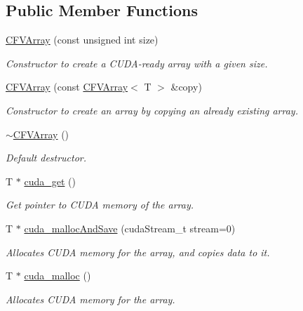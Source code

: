 \subsection*{Public Member Functions}
\begin{DoxyCompactItemize}
\item 
\hyperlink{classFVL_1_1CFVArray_a4533252544513e80b44814b8afab3190}{CFVArray} (const unsigned int size)
\begin{DoxyCompactList}\small\item\em Constructor to create a CUDA-\/ready array with a given size. \item\end{DoxyCompactList}\item 
\hyperlink{classFVL_1_1CFVArray_a2bfe813d44db8292ff5793db73fe7fe0}{CFVArray} (const \hyperlink{classFVL_1_1CFVArray}{CFVArray}$<$ T $>$ \&copy)
\begin{DoxyCompactList}\small\item\em Constructor to create an array by copying an already existing array. \item\end{DoxyCompactList}\item 
\hyperlink{classFVL_1_1CFVArray_a3c7cfa5d9c6793cd2866030b734b5987}{$\sim$CFVArray} ()
\begin{DoxyCompactList}\small\item\em Default destructor. \item\end{DoxyCompactList}\item 
T $\ast$ \hyperlink{classFVL_1_1CFVArray_aa18ec3374bed8aae707bb943f500cb6f}{cuda\_\-get} ()
\begin{DoxyCompactList}\small\item\em Get pointer to CUDA memory of the array. \item\end{DoxyCompactList}\item 
T $\ast$ \hyperlink{classFVL_1_1CFVArray_af2915e0aeb48486f7210527178f3c1da}{cuda\_\-mallocAndSave} (cudaStream\_\-t stream=0)
\begin{DoxyCompactList}\small\item\em Allocates CUDA memory for the array, and copies data to it. \item\end{DoxyCompactList}\item 
T $\ast$ \hyperlink{classFVL_1_1CFVArray_ac5b54e1d7aacbc7ac8f947cc8403143e}{cuda\_\-malloc} ()
\begin{DoxyCompactList}\small\item\em Allocates CUDA memory for the array. \item\end{DoxyCompactList}\item 

\end{DoxyCompactItemize}
